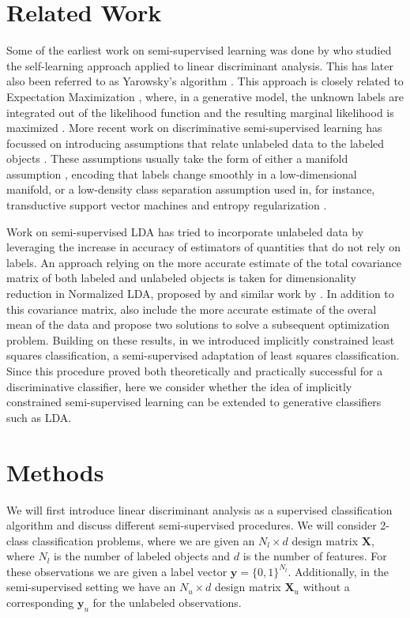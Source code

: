 \documentclass[10pt, a4paper, conference]{IEEEtran}
\begin{document}
\section{Related Work}
Some of the earliest work on semi-supervised learning was done by \cite{McLachlan1975,Taylor1977} who studied the self-learning approach applied to linear discriminant analysis. This has later also been referred to as Yarowsky's algorithm \cite{Yarowsky1995}. This approach is closely related to Expectation Maximization \cite{Abney2004}, where, in a generative model, the unknown labels are integrated out of the likelihood function and the resulting marginal likelihood is maximized \cite{Dempster1977}. More recent work on discriminative semi-supervised learning has focussed on introducing assumptions that relate unlabeled data to the labeled objects \cite{Chapelle2006}. These assumptions usually take the form of either a manifold assumption \cite{Zhu2003}, encoding that labels change smoothly in a low-dimensional manifold, or a low-density class separation assumption used in, for instance, transductive support vector machines \cite{Bennett1998,Joachims1999} and entropy regularization \cite{Grandvalet2005}. 

Work on semi-supervised LDA has tried to incorporate unlabeled data by leveraging the increase in accuracy of estimators of quantities that do not rely on labels. An approach relying on the more accurate estimate of the total covariance matrix of both labeled and unlabeled objects is taken for dimensionality reduction in Normalized LDA, proposed by \cite{Fan2008} and similar work by \cite{Cai2007}. In addition to this covariance matrix, \cite{Loog2014a} also include the more accurate estimate of the overal mean of the data and propose two solutions to solve a subsequent optimization problem. Building on these results, in \cite{Krijthe2013} we introduced implicitly constrained least squares classification, a semi-supervised adaptation of least squares classification. Since this procedure proved both theoretically and practically successful for a discriminative classifier, here we consider whether the idea of implicitly constrained semi-supervised learning can be extended to generative classifiers such as LDA.

\section{Methods}
We will first introduce linear discriminant analysis as a supervised classification algorithm and discuss different semi-supervised procedures. We will consider 2-class classification problems, where we are given an $N_l \times d$ design matrix $\mathbf{X}$, where $N_l$ is the number of labeled objects and $d$ is the number of features. For these observations we are given a label vector $\mathbf{y}=\{0,1\}^{N_l}$. Additionally, in the semi-supervised setting we have an $N_u \times d$ design matrix $\mathbf{X}_u$ without a corresponding $\mathbf{y}_u$ for the unlabeled observations.
\end{document}
